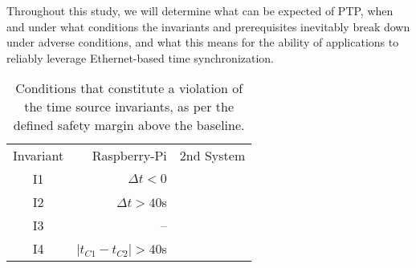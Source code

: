 Throughout this study, we will determine what can be expected of PTP, when and under what conditions the invariants and prerequisites inevitably break down under adverse conditions, and what this means for the ability of applications to reliably leverage Ethernet-based time synchronization.

\begin{table}
    \centering
    \caption{Conditions that constitute a violation of the time source invariants, as per the defined \safetyMargin{} safety margin above the baseline.}
    \begin{tabular}{crr}
        Invariant & Raspberry-Pi& 2nd System\\
        I1 & $\Delta{}t<0$& \\
        I2& $\Delta{}t>40$\textmu{}s& \\
        I3& --& \\
        I4& $|t_{C1} - t_{C2}| > 40$\textmu{}s& \\
    \end{tabular}
    \label{tbl:invariant-violation-limits}
\end{table}
